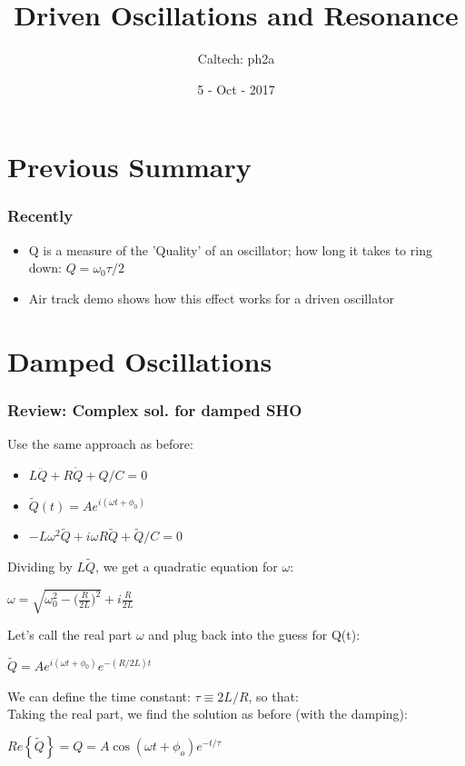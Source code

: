 \documentclass[pdf,hideothersubsections]{beamer}
\begin{document}
\title{Driven Oscillations and Resonance}  
\author{Caltech: ph2a}
\date{5 - Oct - 2017}

\frame{\titlepage} 



\section{Previous Summary}
\begin{frame}
\frametitle{Recently}
\begin{itemize}
\item Q is a measure of the 'Quality' of an oscillator; how long it
  takes to ring down: $Q = \omega_0 \tau / 2$
\pause
\item Air track demo shows how this effect works for a driven oscillator
\pause
\end{itemize}
\end{frame}


\section{Damped Oscillations}
\begin{frame}
\frametitle{Review: Complex sol. for damped SHO}
Use the same approach as before:
\begin{itemize}
\item $L \ddot{Q} + R \dot{Q} + Q/C = 0$
\pause
\item $\tilde{Q}(t) = A e^{i (\omega t + \phi_0)}$
\pause
\item $-L \omega^2 \tilde{Q} + i \omega R \tilde{Q} + \tilde{Q}/C = 0$
\end{itemize}
\pause
Dividing by $L \tilde{Q}$, we get a quadratic equation for $\omega$: \\
\pause
\begin{center}
$\omega = \sqrt{\omega_0^2 - \Big(\frac{R}{2 L}\Big)^2} + i \frac{R}{2 L}$ \\
\end{center}
\pause
Let's call the real part $\omega$ and plug back into the guess for Q(t):
\pause
\begin{center}
$\tilde{Q} = A e^{i (\omega t + \phi_0)} e^{-(R/2 L) t}$\\
\end{center}
\pause
We can define the time constant: $\tau \equiv 2 L/R$, so that: \\
\pause
Taking the real part, we find the solution as before (with the damping): \\
\pause
\begin{center}
$Re\left\{\tilde{Q}\right\} = Q = A \cos(\omega t + \phi_o) e^{-t/\tau}$
\end{center}

\end{frame}
\end{document}
